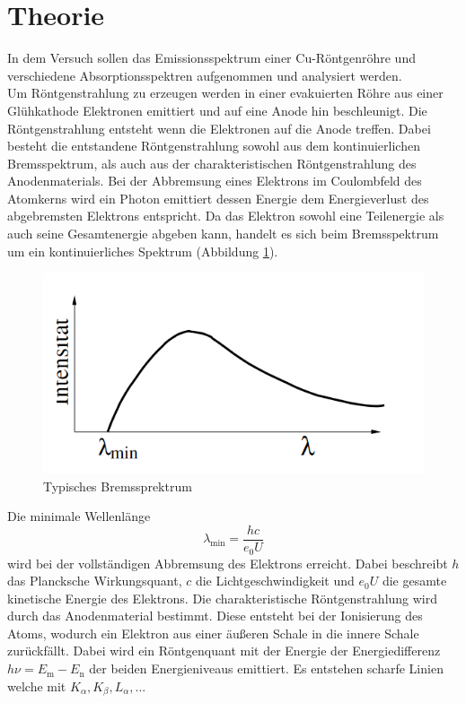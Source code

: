 \section{Theorie}
\label{sec:Theorie}
In dem Versuch sollen das Emissionsspektrum einer Cu-Röntgenröhre und verschiedene Absorptionsspektren aufgenommen und analysiert werden.
\\
Um Röntgenstrahlung zu erzeugen werden in einer evakuierten Röhre aus einer Glühkathode Elektronen emittiert und auf eine Anode hin beschleunigt. 
Die Röntgenstrahlung entsteht wenn die Elektronen auf die Anode treffen. Dabei besteht die entstandene Röntgenstrahlung sowohl aus dem kontinuierlichen
 Bremsspektrum, als auch aus der charakteristischen Röntgenstrahlung des Anodenmaterials. 
 Bei der Abbremsung eines Elektrons im Coulombfeld des Atomkerns wird ein Photon emittiert dessen Energie dem Energieverlust des abgebremsten Elektrons entspricht.
 Da das Elektron sowohl eine Teilenergie als auch seine Gesamtenergie abgeben kann, handelt es sich beim Bremsspektrum um ein kontinuierliches Spektrum (Abbildung \ref{fig:Brems}).
 \begin{figure}
    \centering
    \caption{Typisches Bremssprektrum \cite{V602}}
    \label{fig:Brems}
    \includegraphics[width = 0.6 \textwidth]{pics/Bremsspe.png}
\end{figure}
 Die minimale Wellenlänge 
 \begin{equation}
     \lambda_\text{min}=\frac{h c}{e_0 U}
     \label{eqn:lammin}
 \end{equation}
 wird bei der vollständigen Abbremsung des Elektrons erreicht.
 Dabei beschreibt $h$ das Plancksche Wirkungsquant, $c$ die Lichtgeschwindigkeit und $e_0 U$ die gesamte kinetische Energie des Elektrons.
 Die charakteristische Röntgenstrahlung wird durch das Anodenmaterial bestimmt. Diese entsteht bei der Ionisierung des Atoms, wodurch ein Elektron aus einer äußeren Schale in die innere Schale zurückfällt.
 Dabei wird ein Röntgenquant mit der Energie der Energiedifferenz $h \nu = E_\text{m}-E_\text{n}$ der beiden Energieniveaus emittiert. Es entstehen scharfe Linien welche mit $K_\alpha, K_\beta, L_\alpha, ...$ 
